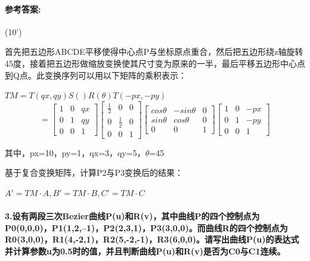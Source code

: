 \documentclass[12pt,a4paper,UTF8]{ctexart}
\begin{document}
	\paragraph{参考答案:}(10')
	\par 首先把五边形ABCDE平移使得中心点P与坐标原点重合，然后把五边形绕z轴旋转45度，接着把五边形做缩放变换使其尺寸变为原来的一半，最后平移五边形中心点到Q点。此变换序列可以用以下矩阵的乘积表示：
	\par $TM=T(qx,qy)S()R(\theta)T(-px,-py)$
	\begin{equation*} 
	=\begin{bmatrix}
	1&0&qx\\
	0&1&qy\\
	0&0&1
	\end{bmatrix}\begin{bmatrix}
	\frac{1}{2}&0&0\\
	0&\frac{1}{2}&0\\
	0&0&1
	\end{bmatrix}\begin{bmatrix}
	cos\theta&-sin\theta&0\\
	sin\theta&cos\theta&0\\
	0&0&1
	\end{bmatrix}\begin{bmatrix}
	1&0&-px\\
	0&1&-py\\
	0&0&1
	\end{bmatrix}
	\end{equation*}
	\par 其中，px=10，py=1，qx=3，qy=5，$\theta$=45
	\par 基于复合变换矩阵，计算P2与P3变换后的结果：
	\par $A'=TM\cdot A, B'=TM\cdot B, C'=TM\cdot C$
	
	\paragraph{3.设有两段三次Bezier曲线P(u)和R(v)，其中曲线P的四个控制点为P0(0,0,0)，P1(1,2,--1)，P2(2,3,1)，P3(3,0,0)。而曲线R的四个控制点为R0(3,0,0)，R1(4,-2,1)，R2(5,-2,-1)，R3(6,0,0)。请写出曲线P(u)的表达式并计算参数u为0.5时的值，并且判断曲线P(u)和R(v)是否为C0与C1连续。}
\end{document}
